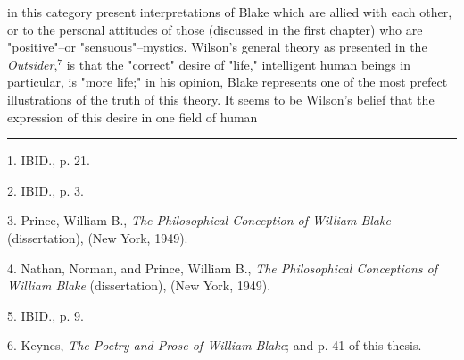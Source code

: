 in this category present interpretations of Blake which are
allied with each other, or to the personal attitudes of
those (discussed in the first chapter) who are "positive"--or
"sensuous"--mystics. Wilson's general theory as presented in the 
\textit{Outsider},$^{7}$ is that the "correct" desire of
"life," intelligent human beings in particular, is "more life;"
in his opinion, Blake represents one of the most 
prefect illustrations of the truth of this theory. It seems to be Wilson's
belief that the expression of this desire in one field of human\linebreak
\null\par
\vspace*{-\baselineskip}
\vspace*{\fill}
\noindent\rule{0.25\textwidth}{0.4pt}\par
1. IBID., p. 21.\par
2. IBID., p. 3.\par
3. Prince, William B., \textit{The Philosophical Conception of William Blake} (dissertation), (New York, 1949).\par
4. Nathan, Norman, and Prince, William B., \textit{The Philosophical Conceptions of William Blake} (dissertation), (New York, 1949).\par
5. IBID., p. 9.\par
6. Keynes, \textit{The Poetry and Prose of William Blake}; and p. 41 of this thesis.\par

\newpage

